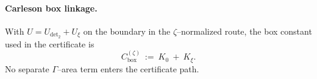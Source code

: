 \documentclass[11pt]{article}
\newif\ifshownumerics
\theoremstyle{definition}
\theoremstyle{remark}
\begin{document}
\vspace{1.0cm}
\paragraph{Carleson box linkage.}
With $U=U_{\det_2}+U_{\xi}$ on the boundary in the $\zeta$–normalized route, the box constant used in the certificate is
\[
  C_{\mathrm{box}}^{(\zeta)}\ :=\ K_0\ +\ K_\xi.
\]
No separate $\Gamma$–area term enters the certificate path.

\ifshownumerics

\vspace{1.0cm}
\paragraph{Numeric instantiation (diagnostic; gated).}
All concrete values (audited constants for $K_0$, $K_\xi$, the $\zeta$–side box constant $C_{\mathrm{box}}^{(\zeta)}$, the evaluation of $C_\psi^{(H^1)}$, and the locked $M_\psi$) are collected for reproducibility; the proof of (P+) uses only the CR–Green right-hand side with the box constant.
\begin{itemize}
  \item \textbf{Window:} fixed $C^\infty$ even $\psi$ with $\psi\equiv 1$ on $[-1,1]$ and $\mathrm{supp}\,\psi\subseteq[-2,2]$, and $\varphi_L(t)=L^{-1}\psi(t/L)$.
  \item \textbf{Poisson lower bound.} Using the closed form for the plateau and monotonicity, $c_0(\psi)\ge 0.1762081912$.
  \item \textbf{Archimedean term.} In the $\zeta$-normalized route with the Blaschke compensator at $s=1$, $C_\Gamma=0$.
  \item \textbf{Hilbert term.} We retain $C_H(\psi)$ symbolically; an explicit envelope can be inserted.
  \item \textbf{Inequality form.} With $M_\psi= (4/\pi)\,C_\psi^{(H^1)}\,\sqrt{C_{\mathrm{box}}^{(\zeta)}}$, the display $\frac{(2/\pi)\,M_\psi}{c_0(\psi)}<\frac{\pi}{2}$ is diagnostic.
\end{itemize}
 
\fi








\vspace{1.0cm}
\end{document}
